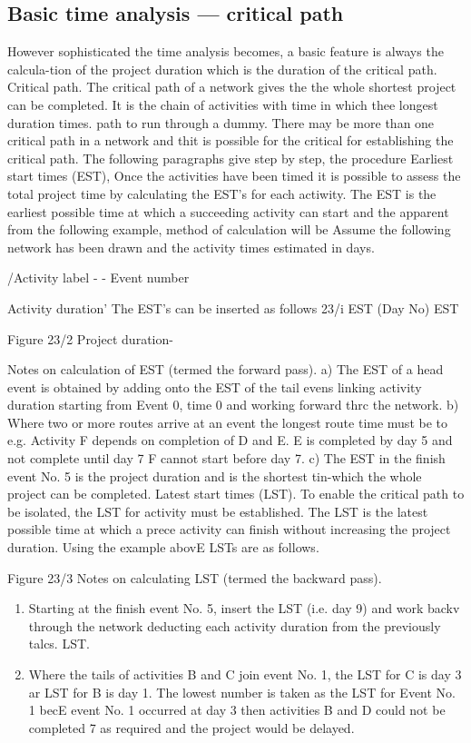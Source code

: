 \documentclass[]{report}
\begin{document}
\subsection{Basic time analysis — critical path}
However sophisticated the time analysis becomes, a basic feature is always the calcula-tion of the project duration which is the duration of the critical path. Critical path. The critical path of a network gives the the whole shortest project can be completed. It is the chain of activities with time in which thee longest duration times. path to run through a dummy. There may be more than one critical path in a network and thit is possible for the critical for establishing the critical path. The following paragraphs give step by step, the procedure Earliest start times (EST), Once the activities have been timed it is possible to assess the total project time by calculating the EST's for each actiwity. The EST is the earliest possible time at which a succeeding activity can start and the apparent from the following example, method of calculation will be Assume the following network has been drawn and the activity times estimated in days. 

/Activity label - - Event number 

Activity duration' The EST's can be inserted as follows 23/i EST (Day No) 
EST 

Figure 23/2 
Project duration-

Notes on calculation of EST (termed the forward pass). a) The EST of a head event is obtained by adding onto the EST of the tail evens linking activity duration starting from Event 0, time 0 and working forward thrc the network. b) Where two or more routes arrive at an event the longest route time must be to e.g. Activity F depends on completion of D and E. E is completed by day 5 and not complete until day 7 F cannot start before day 7. c) The EST in the finish event No. 5 is the project duration and is the shortest tin-which the whole project can be completed. Latest start times (LST). To enable the critical path to be isolated, the LST for activity must be established. The LST is the latest possible time at which a prece activity can finish without increasing the project duration. Using the example abovE LSTs are as follows. 

Figure 23/3 Notes on calculating LST (termed the backward pass). 
\begin{enumerate}
	\item Starting at the finish event No. 5, insert the LST (i.e. day 9) and work backv through the network deducting each activity duration from the previously talcs. LST. 
\item Where the tails of activities B and C join event No. 1, the LST for C is day 3 ar LST for B is day 1. The lowest number is taken as the LST for Event No. 1 becE event No. 1 occurred at day 3 then activities B and D could not be completed 7 as required and the project would be delayed. 
\end{enumerate}
\end{document}

